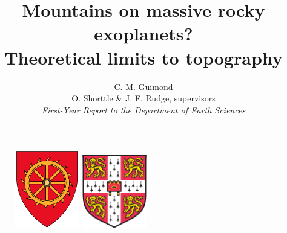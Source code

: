 \documentclass[10pt,a4paper]{article}
\author{C. M. Guimond \\ \normalsize O. Shorttle \& J. F. Rudge, supervisors \\ \textit{First-Year Report to the Department of Earth Sciences}}
\title{Mountains on massive rocky exoplanets? \\ \large Theoretical limits to topography}
\begin{document}
\begin{figure}
    \centering
    \begin{minipage}{0.5\textwidth}
        \centering
        \includegraphics[width=0.25\textwidth]{cats} %
    \end{minipage}\hfill
    \begin{minipage}{0.5\textwidth}
        \centering
        \includegraphics[width=0.25\textwidth]{cam} %
    \end{minipage}
\end{figure}

\maketitle




\tableofcontents








\setcounter{equation}{0}
\renewcommand{\theequation}{A\arabic{equation}}
\setcounter{table}{0}
\renewcommand{\thetable}{A\arabic{table}}
\begin{appendices}


\end{appendices}
\end{document}
